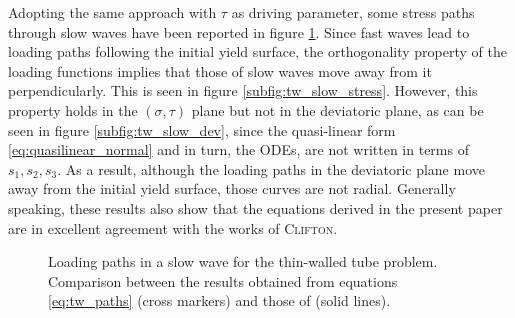Adopting the same approach with $\tau$ as driving parameter, some stress paths through slow waves have been reported in figure \ref{fig:tw_slow}.
Since fast waves lead to loading paths following the initial yield surface, the orthogonality property of the loading functions implies that those of slow waves move away from it perpendicularly.
This is seen in figure \ref{subfig:tw_slow_stress}.
However, this property holds in the $(\sigma,\tau)$ plane but not in the deviatoric plane, as can be seen in figure \ref{subfig:tw_slow_dev}, since the quasi-linear form \eqref{eq:quasilinear_normal} and in turn, the ODEs, are not written in terms of $s_1,s_2,s_3$.
As a result, although the loading paths in the deviatoric plane move away from the initial yield surface, those curves are not radial.
Generally speaking, these results also show that the equations derived in the present paper are in excellent agreement with the works of \textsc{Clifton}.
\begin{figure}[h!]
  \centering
   \qquad
  \caption{Loading paths in a slow wave for the thin-walled tube problem. Comparison between the results obtained from equations \eqref{eq:tw_paths} (cross markers) and those of \cite{Clifton} (solid lines).} 
  \label{fig:tw_slow}
\end{figure}



